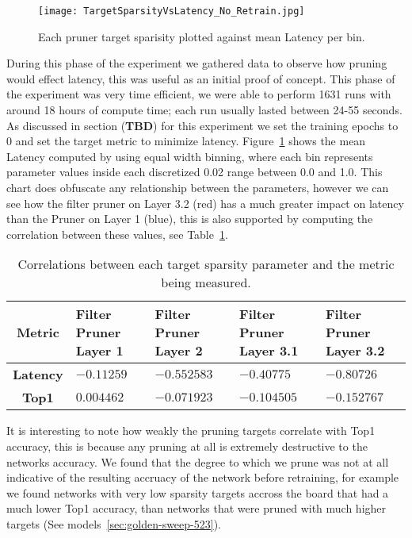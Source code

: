 \documentclass[../Dissertation.tex]{subfiles}
\begin{document}
\begin{figure}[H]
    \texttt{[image: TargetSparsityVsLatency\_No\_Retrain.jpg]}
    \caption{Each pruner target sparisity plotted against mean Latency per bin.}
    \label{fig:fastPruneParamVSLatency}
\end{figure}

During this phase of the experiment we gathered data to observe how pruning would effect latency, this was useful as an initial proof of concept.
This phase of the experiment was very time efficient, we were able to perform 1631 runs with around 18 hours of compute time; each run usually lasted between 24-55 seconds. 
As discussed in section (\textbf{TBD}) for this experiment we set the training epochs to 0 and set the target metric to minimize latency. 
Figure~\ref{fig:fastPruneParamVSLatency} shows the mean Latency computed by using equal width binning, where each bin represents parameter values inside each discretized 0.02 range between 0.0 and 1.0.
This chart does obfuscate any relationship between the parameters, however we can see how the filter pruner on Layer 3.2 (red) has a much greater impact on latency than the Pruner on Layer 1 (blue), this is also supported by computing the correlation between these values, see Table~\ref{tab:fastPruneCorrelations}.

\singlespacing
\begin{table}[H]
    \centering
    \begin{tabular}{@{}cp{26mm}p{26mm}p{26mm}p{26mm}@{}}
    \toprule
    \textbf{Metric}  & \textbf{Filter Pruner  Layer 1} & \textbf{Filter Pruner Layer 2} & \textbf{Filter Pruner Layer 3.1} & \textbf{Filter Pruner Layer 3.2} \\ \midrule
    \textbf{Latency} & $-0.11259$                        & $-0.552583$                      & $-0.40775$                         & $-0.80726$                         \\
    \textbf{Top1}    & $0.004462$                        & $-0.071923$                      & $-0.104505$                        & $-0.152767$                        \\ \bottomrule
    \end{tabular}
    \caption{Correlations between each target sparsity parameter and the metric being measured.}
    \label{tab:fastPruneCorrelations}
\end{table}
\doublespacing

It is interesting to note how weakly the pruning targets correlate with Top1 accuracy, this is because any pruning at all is extremely destructive to the networks accuracy. 
We found that the degree to which we prune was not at all indicative of the resulting accruacy of the network before retraining, for example we found networks with very low sparsity targets accross the board that had a much lower Top1 accuracy, than networks that were pruned with much higher targets (See models~\ref{sec:golden-sweep-523}).
\end{document}
